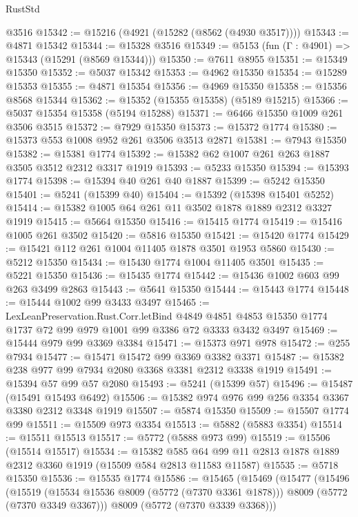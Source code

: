 \begin{lexlean}{RustStd}
\begin{coremodule}
    @3516
@15342 := @15216 (@4921 (@15282 (@8562 (@4930 @3517))))
@15343 := @4871 @15342
@15344 := @15328 @3516
@15349 := @5153 (fun (Γ : @4901) => @15343 (@15291 (@8569 @15344)))
@15350 := @7611 @8955
@15351 := @15349 @15350
@15352 := @5037 @15342
@15353 := @4962 @15350
@15354 := @15289 @15353
@15355 := @4871 @15354
@15356 := @4969 @15350
@15358 := @15356 @8568 @15344
@15362 := @15352 (@15355 @15358) (@5189 @15215)
@15366 := @5037 @15354 @15358 (@5194 @15288)
@15371 := @6466 @15350 @1009 @261 @3506 @3515
@15372 := @7929 @15350
@15373 := @15372 @1774
@15380 := @15373 @553 @1008 @952 @261 @3506 @3513 @2871
@15381 := @7943 @15350
@15382 := @15381 @1774
@15392 := @15382 @62 @1007 @261 @263 @1887 @3505 @3512 @2312 @3317 @1919
@15393 := @5233 @15350
@15394 := @15393 @1774
@15398 := @15394 @40 @261 @40 @1887
@15399 := @5242 @15350
@15401 := @5241 (@15399 @40)
@15404 := @15392 (@15398 @15401 @5252)
@15414 := @15382 @1005 @64 @261 @11 @3502 @1878 @1889 @2312 @3327 @1919
@15415 := @5664 @15350
@15416 := @15415 @1774
@15419 := @15416 @1005 @261 @3502
@15420 := @5816 @15350
@15421 := @15420 @1774
@15429 := @15421 @112 @261 @1004 @11405 @1878 @3501 @1953 @5860
@15430 := @5212 @15350
@15434 := @15430 @1774 @1004 @11405 @3501
@15435 := @5221 @15350
@15436 := @15435 @1774
@15442 := @15436 @1002 @603 @99 @263 @3499 @2863
@15443 := @5641 @15350
@15444 := @15443 @1774
@15448 := @15444 @1002 @99 @3433 @3497
@15465 := LexLeanPreservation.Rust.Corr.letBind
    @4849
    @4851
    @4853
    @15350
    @1774
    @1737
    @72
    @99
    @979
    @1001
    @99
    @3386
    @72
    @3333
    @3432
    @3497
@15469 := @15444 @979 @99 @3369 @3384
@15471 := @15373 @971 @978
@15472 := @255 @7934
@15477 := @15471 @15472 @99 @3369 @3382 @3371
@15487 := @15382 @238 @977 @99 @7934 @2080 @3368 @3381 @2312 @3338 @1919
@15491 := @15394 @57 @99 @57 @2080
@15493 := @5241 (@15399 @57)
@15496 := @15487 (@15491 @15493 @6492)
@15506 := @15382 @974 @976 @99 @256 @3354 @3367 @3380 @2312 @3348 @1919
@15507 := @5874 @15350
@15509 := @15507 @1774 @99
@15511 := @15509 @973 @3354
@15513 := @5882 (@5883 @3354)
@15514 := @15511 @15513
@15517 := @5772 (@5888 @973 @99)
@15519 := @15506 (@15514 @15517)
@15534 := @15382
    @585
    @64
    @99
    @11
    @2813
    @1878
    @1889
    @2312
    @3360
    @1919
    (@15509 @584 @2813 @11583 @11587)
@15535 := @5718 @15350
@15536 := @15535 @1774
@15586 := @15465
    (@15469
      (@15477
        (@15496
          (@15519
            (@15534 @15536 @8009 (@5772 (@7370 @3361 @1878)))
            @8009
            (@5772 (@7370 @3349 @3367)))
          @8009
          (@5772 (@7370 @3339 @3368)))

\end{coremodule}
\end{lexlean}
